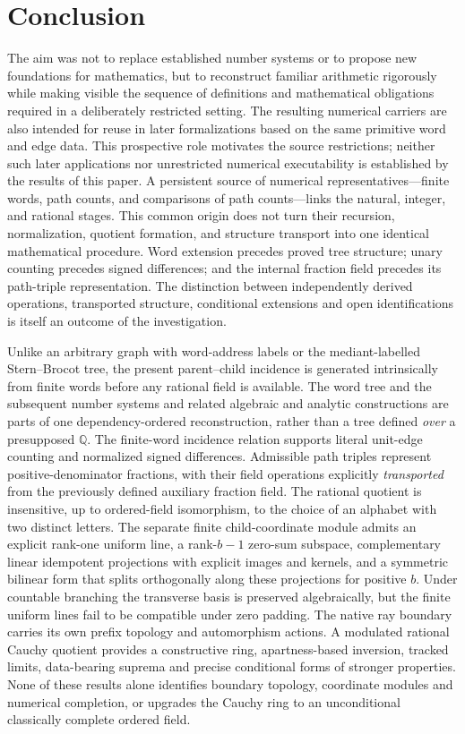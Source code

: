 \documentclass[11pt,reqno]{amsart}
\theoremstyle{definition}\newtheorem{definition}[theorem]{Definition}
\theoremstyle{remark}\newtheorem{remark}[theorem]{Remark}
\begin{document}
\clearpage
\section{Conclusion}\label{sec:conclusion}
The aim was not to replace established number systems or to propose new foundations for mathematics, but to reconstruct familiar arithmetic rigorously while making visible the sequence of definitions and mathematical obligations required in a deliberately restricted setting. The resulting numerical carriers are also intended for reuse in later formalizations based on the same primitive word and edge data. This prospective role motivates the source restrictions; neither such later applications nor unrestricted numerical executability is established by the results of this paper. A persistent source of numerical representatives---finite words, path counts, and comparisons of path counts---links the natural, integer, and rational stages. This common origin does not turn their recursion, normalization, quotient formation, and structure transport into one identical mathematical procedure. Word extension precedes proved tree structure; unary counting precedes signed differences; and the internal fraction field precedes its path-triple representation. The distinction between independently derived operations, transported structure, conditional extensions and open identifications is itself an outcome of the investigation.


Unlike an arbitrary graph with word-address labels or the mediant-labelled Stern--Brocot tree, the present parent--child incidence is generated intrinsically from finite words before any rational field is available. The word tree and the subsequent number systems and related algebraic and analytic constructions are parts of one dependency-ordered reconstruction, rather than a tree defined \emph{over} a presupposed $\mathbb Q$. The finite-word incidence relation supports literal unit-edge counting and normalized signed differences. Admissible path triples represent positive-denominator fractions, with their field operations explicitly \emph{transported} from the previously defined auxiliary fraction field. The rational quotient is insensitive, up to ordered-field isomorphism, to the choice of an alphabet with two distinct letters. The separate finite child-coordinate module admits an explicit rank-one uniform line, a rank-$b-1$ zero-sum subspace, complementary linear idempotent projections with explicit images and kernels, and a symmetric bilinear form that splits orthogonally along these projections for positive $b$. Under countable branching the transverse basis is preserved algebraically, but the finite uniform lines fail to be compatible under zero padding. The native ray boundary carries its own prefix topology and automorphism actions. A modulated rational Cauchy quotient provides a constructive ring, apartness-based inversion, tracked limits, data-bearing suprema and precise conditional forms of stronger properties. None of these results alone identifies boundary topology, coordinate modules and numerical completion, or upgrades the Cauchy ring to an unconditional classically complete ordered field.
\end{document}
